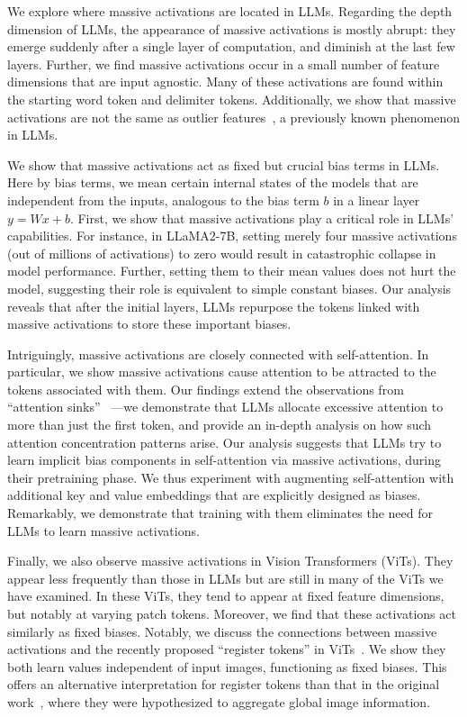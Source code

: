 We explore where massive activations are located in LLMs. Regarding the depth dimension of LLMs, the appearance of massive activations is mostly abrupt: they emerge suddenly after a single layer of computation, and  diminish at the last few layers. Further, we find massive activations occur in a small number of feature dimensions that are input agnostic. Many of these activations are found within the starting word token and delimiter tokens. Additionally, we show that massive activations are not the same as outlier features~\citep{dettmers2022llmint8}, a previously known phenomenon in LLMs.

We show that massive activations act as fixed but crucial bias terms in LLMs. Here by bias terms, we mean certain internal states of the models that are independent from the inputs, analogous to the bias term $b$ in a linear layer $y=Wx+b$. First, we show that massive activations play a critical role in LLMs' capabilities. For instance, in LLaMA2-7B, setting merely four massive activations (out of millions of activations) to zero would result in catastrophic collapse in model performance. Further, setting them to their mean values does not hurt the model, suggesting their role is equivalent to simple constant biases. Our analysis reveals that after the initial layers, LLMs repurpose the tokens linked with massive activations to store these important biases.

Intriguingly, massive activations are closely connected with self-attention. In particular, we show massive activations cause attention to be attracted to the tokens associated with them. Our findings extend the observations from ``attention sinks'' ~\citep{xiao2023sink}---we demonstrate that LLMs allocate excessive attention to more than just the first token, and provide an in-depth analysis on how such attention concentration patterns arise. Our analysis suggests that LLMs try to learn implicit bias components in self-attention via massive activations, during their pretraining phase. We thus experiment with augmenting self-attention with additional key and value embeddings that are explicitly designed as biases. Remarkably, we demonstrate that training with them eliminates the need for LLMs to learn massive activations.

Finally, we also observe massive activations in Vision Transformers (ViTs). They appear less frequently than those in LLMs but are still in many of the ViTs we have examined. In these ViTs, they tend to appear at fixed feature dimensions, but notably at varying patch tokens. Moreover, we find that these activations act similarly as fixed biases. Notably, we discuss the connections between massive activations and the recently proposed ``register tokens'' in ViTs~\citep{darcet2023register}. We show they both learn values independent of input images, functioning as fixed biases. This offers an alternative interpretation for register tokens than that in the original work~\citep{darcet2023register}, where they were hypothesized to aggregate global image information. 

